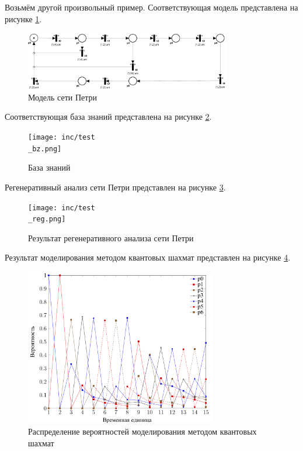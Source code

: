 Возьмём другой произвольный пример. Соответствующая модель представлена на рисунке \ref{fig:test}.

\begin{figure}[h!btp]
	\centering
	\includegraphics[width=0.8\textwidth]{inc/test.pdf}
	\caption{Модель сети Петри}
	\label{fig:test}	
\end{figure}

Соответствующая база знаний представлена на рисунке \ref{fig:testbz}.

\begin{figure}[h!btp]
	\centering
	\texttt{[image: inc/test\\\_bz.png]}
	\caption{База знаний}
	\label{fig:testbz}
\end{figure}

Регенеративный анализ сети Петри представлен на рисунке \ref{fig:testreg}.

\clearpage

\begin{figure}
	\centering
	\texttt{[image: inc/test\\\_reg.png]}
	\caption{Результат регенеративного анализа сети Петри}
	\label{fig:testreg}
\end{figure}

\clearpage

Результат моделирования методом квантовых шахмат представлен на рисунке \ref{fig:testchess}.

\begin{figure}[h!btp]
	\centering
	\includegraphics[width=0.75\textwidth]{inc/test.png}
	\caption{Распределение вероятностей моделирования методом квантовых шахмат}
	\label{fig:testchess}
\end{figure}

